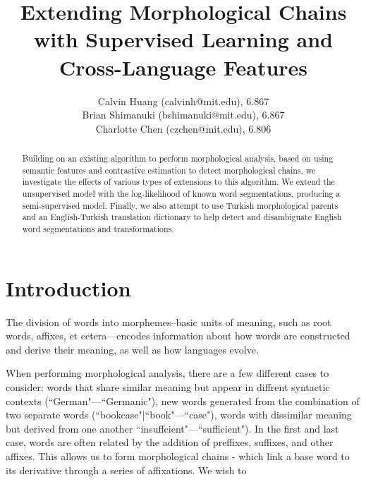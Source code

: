 \documentclass[11pt,twocolumn]{article}
\begin{document}
 
\title{Extending Morphological Chains with Supervised Learning and Cross-Language Features}

\author{Calvin Huang (calvinh@mit.edu), 6.867\\
    Brian Shimanuki (bshimanuki@mit.edu), 6.867\\
    Charlotte Chen (czchen@mit.edu), 6.806\\
}

\maketitle
\thispagestyle{empty}

\begin{abstract}
    Building on an existing algorithm to perform morphological analysis,
    based on using semantic features and contrastive estimation to detect morphological chains,
    we investigate the effects of various types of extensions to this algorithm.
    We extend the unsupervised model with the log-likelihood of known word segmentations,
    producing a semi-supervised model.
    Finally, we also attempt to use Turkish morphological parents and an English-Turkish translation
    dictionary to help detect and disambiguate English word segmentations and transformations.
\end{abstract}

\section{Introduction}
The division of words into morphemes--basic units of meaning, such as root words,
affixes, et cetera---encodes information about how words are constructed and derive their meaning,
as well as how languages evolve.

When performing morphological analysis, there are a few different cases to consider: words that share similar
meaning but appear in diffrent syntactic contexts (``German"---``Germanic"), new words generated from
the combination of two separate words (``bookcase"|``book"---``case"), words with dissimilar meaning but
derived from one another ``insuffcient"---``sufficient"). In the first and last case, words are often related
by the addition of preffixes, suffixes, and other affixes. This allows us to form morphological chains - which
link a base word to its derivative through a series of affixations.
We wish to 

\end{document}
